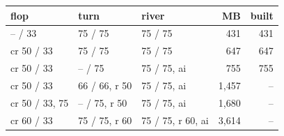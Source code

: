 \begin{tabular}{lllrr}
\toprule
flop & turn & river & MB & built \\ \midrule
-- / 33 & 75 / 75 & 75 / 75 & 431 & 431 \\
cr 50 / 33 & 75 / 75 & 75 / 75 & 647 & 647 \\
cr 50 / 33 & -- / 75 & 75 / 75, ai & 755 & 755 \\
cr 50 / 33 & 66 / 66, r 50 & 75 / 75, ai & 1,457 & -- \\
cr 50 / 33, 75 & -- / 75, r 50 & 75 / 75, ai & 1,680 & -- \\
cr 60 / 33 & 75 / 75, r 60 & 75 / 75, r 60, ai & 3,614 & -- \\
\bottomrule
\end{tabular}

